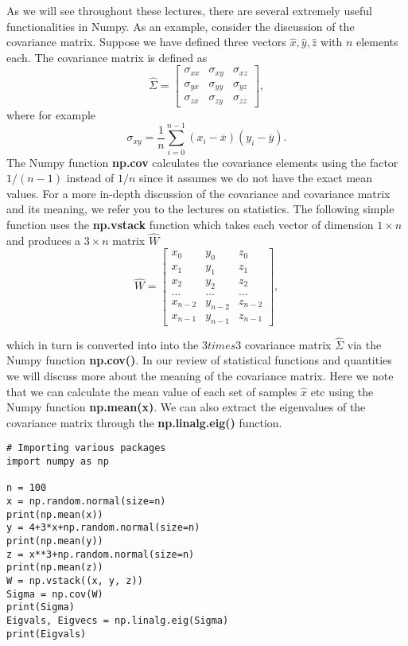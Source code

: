 \documentclass[%
oneside,                 %
final,                   %
10pt]{article}
\begin{document}
As we will see throughout these lectures, there are several extremely useful functionalities in Numpy.
As an example, consider the discussion of the covariance matrix. Suppose we have defined three vectors
$\hat{x}, \hat{y}, \hat{z}$ with $n$ elements each. The covariance matrix is defined as 
\[
\hat{\Sigma} = \begin{bmatrix} \sigma_{xx} & \sigma_{xy} & \sigma_{xz} \\
                              \sigma_{yx} & \sigma_{yy} & \sigma_{yz} \\
                              \sigma_{zx} & \sigma_{zy} & \sigma_{zz} 
             \end{bmatrix},
\]
where for example
\[
\sigma_{xy} =\frac{1}{n} \sum_{i=0}^{n-1}(x_i- \overline{x})(y_i- \overline{y}).
\]
The Numpy function \textbf{np.cov} calculates the covariance elements using the factor $1/(n-1)$ instead of $1/n$ since it assumes we do not have the exact mean values. For a more in-depth discussion of the covariance and covariance matrix and its meaning, we refer you to the lectures on statistics. 
The following simple function uses the \textbf{np.vstack} function which takes each vector of dimension $1\times n$ and produces a $ 3\times n$ matrix $\hat{W}$
\[
\hat{W} = \begin{bmatrix} x_0 & y_0 & z_0 \\
                          x_1 & y_1 & z_1 \\
                          x_2 & y_2 & z_2 \\
                          \dots & \dots & \dots \\
                          x_{n-2} & y_{n-2} & z_{n-2} \\
                          x_{n-1} & y_{n-1} & z_{n-1}
             \end{bmatrix},
\]

which in turn is converted into into the $3 times 3$ covariance matrix
$\hat{\Sigma}$ via the Numpy function \textbf{np.cov()}. In our review of
statistical functions and quantities we will discuss more about the
meaning of the covariance matrix. Here we note that we can calculate
the mean value of each set of samples $\hat{x}$ etc using the Numpy
function \textbf{np.mean(x)}. We can also extract the eigenvalues of the
covariance matrix through the \textbf{np.linalg.eig()} function.

\begin{verbatim}
# Importing various packages
import numpy as np

n = 100
x = np.random.normal(size=n)
print(np.mean(x))
y = 4+3*x+np.random.normal(size=n)
print(np.mean(y))
z = x**3+np.random.normal(size=n)
print(np.mean(z))
W = np.vstack((x, y, z))
Sigma = np.cov(W)
print(Sigma)
Eigvals, Eigvecs = np.linalg.eig(Sigma)
print(Eigvals)
\end{verbatim}
\end{document}
